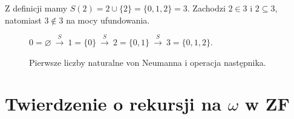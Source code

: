 \begin{przyklad}
\label{ex:zf-vn-steps}
Z definicji mamy $S(2)=2\cup\{2\}=\{0,1,2\}=3$.
Zachodzi $2\in3$ i $2\subseteq3$,
natomiast $3\notin3$ na mocy ufundowania.
\end{przyklad}

\begin{figure}[htbp]
\centering
$\displaystyle
0=\varnothing\ \xrightarrow{\ S\ }\ 
1=\{0\}\ \xrightarrow{\ S\ }\ 
2=\{0,1\}\ \xrightarrow{\ S\ }\ 
3=\{0,1,2\}.
$
\caption{Pierwsze liczby naturalne von Neumanna i operacja następnika.}
\label{fig:zf-vn-successor}
\end{figure}

\section{Twierdzenie o rekursji na \texorpdfstring{$\omega$}{omega} w ZF}

